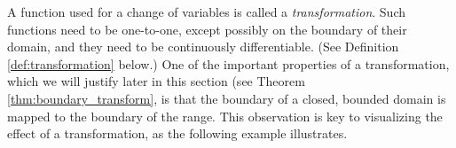 


\enlargethispage{2\baselineskip}

A function used for a change of variables is called a \emph{transformation}. Such functions need to be one-to-one, except possibly on the boundary of their domain, and they need to be continuously differentiable. (See Definition \ref{def:transformation} below.) One of the important properties of a transformation, which we will justify later in this section (see Theorem \ref{thm:boundary_transform}, is that the boundary of a closed, bounded domain is mapped to the boundary of the range. This observation is key to visualizing the effect of a transformation, as the following example illustrates.\\

